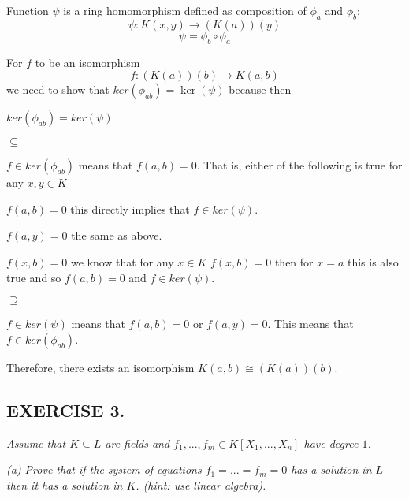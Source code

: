 \documentclass{article}
\begin{document}
Function $\psi$ is a ring homomorphism defined as composition of $\phi_a$ and $\phi_b$:
$$\psi:K(x, y)\to(K(a))(y)$$
$$\psi=\phi_b\circ\phi_a$$

For $f$ to be an isomorphism
$$f:(K(a))(b)\to K(a, b)$$
we need to show that $ker(\phi_{ab})=\ker(\psi)$ because then
\begin{center}
\end{center}

$ker(\phi_{ab})=ker(\psi)$

$\subseteq$

$f\in ker(\phi_{ab})$ means that $f(a, b)=0$. That is, either of the following is true for any $x, y\in K$

\indent $f(a, b)=0$ this directly implies that $f\in ker(\psi)$.

\indent $f(a, y)=0$ the same as above.

\indent $f(x, b)=0$ we know that for any $x\in K$ $f(x, b)=0$ then for $x=a$ this is also true and so $f(a, b)=0$ and $f\in ker(\psi)$.

$\supseteq$

$f\in ker(\psi)$ means that $f(a, b)=0$ or $f(a, y)=0$. This means that $f\in ker(\phi_{ab})$.

Therefore, there exists an isomorphism $K(a, b)\cong (K(a))(b)$.

\subsection*{EXERCISE 3.}
\emph{Assume that $K\subseteq L$ are fields and $f_1,...,f_m\in K[X_1,...,X_n]$ have degree $1$.}

\emph{(a) Prove that if the system of equations $f_1=...=f_m=0$ has a solution in $L$ then it has a solution in $K$. (hint: use linear algebra).}
\bigskip


\end{document}
